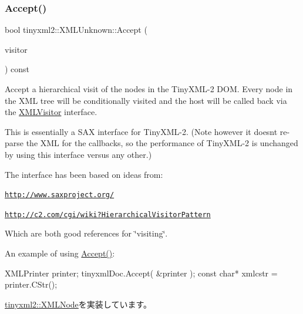 \subsubsection{\texorpdfstring{Accept()}{Accept()}}
{\footnotesize\ttfamily bool tinyxml2\+::\+X\+M\+L\+Unknown\+::\+Accept (\begin{DoxyParamCaption}\item[{\hyperlink{classtinyxml2_1_1_x_m_l_visitor}{X\+M\+L\+Visitor} $\ast$}]{visitor }\end{DoxyParamCaption}) const\hspace{0.3cm}{\ttfamily [virtual]}}

Accept a hierarchical visit of the nodes in the Tiny\+X\+M\+L-\/2 D\+OM. Every node in the X\+ML tree will be conditionally visited and the host will be called back via the \hyperlink{classtinyxml2_1_1_x_m_l_visitor}{X\+M\+L\+Visitor} interface.

This is essentially a S\+AX interface for Tiny\+X\+M\+L-\/2. (Note however it doesn\textquotesingle{}t re-\/parse the X\+ML for the callbacks, so the performance of Tiny\+X\+M\+L-\/2 is unchanged by using this interface versus any other.)

The interface has been based on ideas from\+:


\begin{DoxyItemize}
\item \href{http://www.saxproject.org/}{\tt http\+://www.\+saxproject.\+org/}
\item \href{http://c2.com/cgi/wiki?HierarchicalVisitorPattern}{\tt http\+://c2.\+com/cgi/wiki?\+Hierarchical\+Visitor\+Pattern}
\end{DoxyItemize}

Which are both good references for \char`\"{}visiting\char`\"{}.

An example of using \hyperlink{classtinyxml2_1_1_x_m_l_unknown_a8a06b8c82117ca969a432e17a46830fc}{Accept()}\+: \begin{DoxyVerb}XMLPrinter printer;
tinyxmlDoc.Accept( &printer );
const char* xmlcstr = printer.CStr();
\end{DoxyVerb}
 

\hyperlink{classtinyxml2_1_1_x_m_l_node_a81e66df0a44c67a7af17f3b77a152785}{tinyxml2\+::\+X\+M\+L\+Node}を実装しています。

\mbox{\label{classtinyxml2_1_1_x_m_l_unknown_ab73b48b819aa4b2ef3815dc2d7d20d5f}} 
